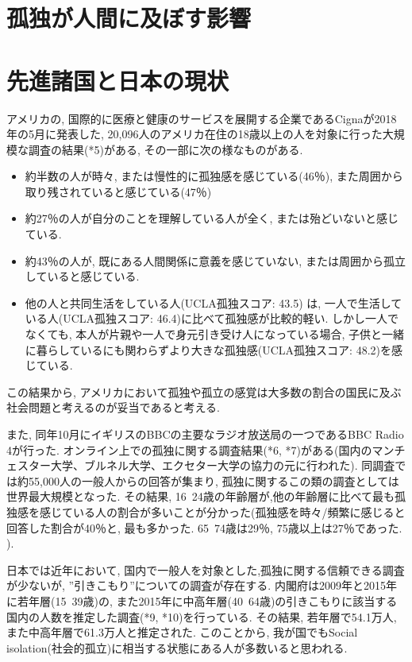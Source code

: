 \documentclass[a4paper,dvipdfmx]{hisken}
\begin{document}
\section{孤独が人間に及ぼす影響}

\section{先進諸国と日本の現状}
アメリカの, 国際的に医療と健康のサービスを展開する企業であるCignaが2018年の5月に発表した, 20,096人のアメリカ在住の18歳以上の人を対象に行った大規模な調査の結果(*5)がある, その一部に次の様なものがある. 
\begin{itemize}
\item 約半数の人が時々, または慢性的に孤独感を感じている(46％), また周囲から取り残されていると感じている(47％)
\item 約27％の人が自分のことを理解している人が全く, または殆どいないと感じている. 
\item 約43％の人が, 既にある人間関係に意義を感じていない, または周囲から孤立していると感じている. 
\item 他の人と共同生活をしている人(UCLA孤独スコア: 43.5) は, 一人で生活している人(UCLA孤独スコア: 46.4)に比べて孤独感が比較的軽い. しかし一人でなくても, 本人が片親や一人で身元引き受け人になっている場合, 子供と一緒に暮らしているにも関わらずより大きな孤独感(UCLA孤独スコア: 48.2)を感じている. 
\end{itemize}


この結果から, アメリカにおいて孤独や孤立の感覚は大多数の割合の国民に及ぶ社会問題と考えるのが妥当であると考える.

また, 同年10月にイギリスのBBCの主要なラジオ放送局の一つであるBBC Radio 4が行った. オンライン上での孤独に関する調査結果(*6, *7)がある(国内のマンチェスター大学、ブルネル大学、エクセター大学の協力の元に行われた). 同調査では約55,000人の一般人からの回答が集まり, 孤独に関するこの類の調査としては世界最大規模となった. 
その結果, 16~24歳の年齢層が,他の年齢層に比べて最も孤独感を感じている人の割合が多いことが分かった(孤独感を時々/頻繁に感じると回答した割合が40％と, 最も多かった. 65~74歳は29％, 75歳以上は27％であった. ). 

日本では近年において, 国内で一般人を対象とした,孤独に関する信頼できる調査が少ないが, ”引きこもり”についての調査が存在する. 
内閣府は2009年と2015年に若年層(15~39歳)の, また2015年に中高年層(40~64歳)の引きこもりに該当する国内の人数を推定した調査(*9, *10)を行っている. その結果, 若年層で54.1万人, また中高年層で61.3万人と推定された.
このことから, 我が国でもSocial isolation(社会的孤立)に相当する状態にある人が多数いると思われる.
\end{document}
